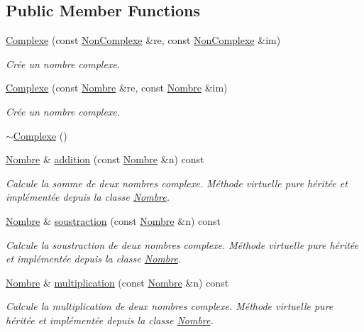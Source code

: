 \subsection*{\-Public \-Member \-Functions}
\begin{DoxyCompactItemize}
\item 
\hyperlink{classComplexe_a562ddecce2f4ab4b7535140fad2d0224}{\-Complexe} (const \hyperlink{classNonComplexe}{\-Non\-Complexe} \&re, const \hyperlink{classNonComplexe}{\-Non\-Complexe} \&im)
\begin{DoxyCompactList}\small\item\em \-Crée un nombre complexe. \end{DoxyCompactList}\item 
\hyperlink{classComplexe_aa0a80cdd5bd70c226641c43c251a0d24}{\-Complexe} (const \hyperlink{classNombre}{\-Nombre} \&re, const \hyperlink{classNombre}{\-Nombre} \&im)
\begin{DoxyCompactList}\small\item\em \-Crée un nombre complexe. \end{DoxyCompactList}\item 
\hyperlink{classComplexe_ac92996231047d39d40e11384bb9311b6}{$\sim$\-Complexe} ()
\item 
\hyperlink{classNombre}{\-Nombre} \& \hyperlink{classComplexe_a699074c8d13ed87b68aeb80463ea1379}{addition} (const \hyperlink{classNombre}{\-Nombre} \&n) const 
\begin{DoxyCompactList}\small\item\em \-Calcule la somme de deux nombres complexe. \-Méthode virtuelle pure héritée et implémentée depuis la classe \hyperlink{classNombre}{\-Nombre}. \end{DoxyCompactList}\item 
\hyperlink{classNombre}{\-Nombre} \& \hyperlink{classComplexe_a54ecc525a7dc0e6491cd3125010b30bf}{soustraction} (const \hyperlink{classNombre}{\-Nombre} \&n) const 
\begin{DoxyCompactList}\small\item\em \-Calcule la soustraction de deux nombres complexe. \-Méthode virtuelle pure héritée et implémentée depuis la classe \hyperlink{classNombre}{\-Nombre}. \end{DoxyCompactList}\item 
\hyperlink{classNombre}{\-Nombre} \& \hyperlink{classComplexe_a1137e6bfa881a8523463adf6f1f15a36}{multiplication} (const \hyperlink{classNombre}{\-Nombre} \&n) const 
\begin{DoxyCompactList}\small\item\em \-Calcule la multiplication de deux nombres complexe. \-Méthode virtuelle pure héritée et implémentée depuis la classe \hyperlink{classNombre}{\-Nombre}. \end{DoxyCompactList}\item 

\end{DoxyCompactItemize}
